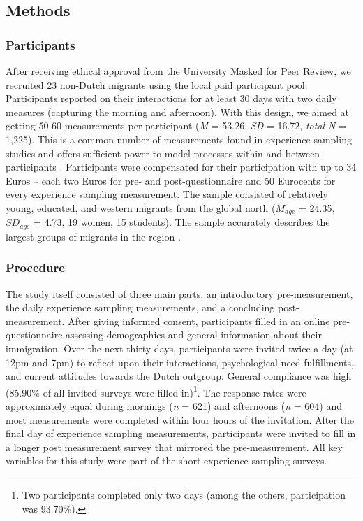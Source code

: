 \documentclass[man, 12pt, a4paper, mask]{apa7}
\theoremstyle{break}
\theoremstyle{plain}
\begin{document}
\subsection{Methods}

\subsubsection{Participants}

After receiving ethical approval from the University Masked for Peer
Review, we recruited 23 non-Dutch migrants using the local paid
participant pool. Participants reported on their interactions for at
least 30 days with two daily measures (capturing the morning and
afternoon). With this design, we aimed at getting 50-60 measurements per
participant (\textit{M} = 53.26, \textit{SD} = 16.72, \textit{total N} =
1,225). This is a common number of measurements found in experience
sampling studies and offers sufficient power to model processes within
and between participants \citep[e.g.,][]{AanhetRot2012}. Participants
were compensated for their participation with up to 34 Euros -- each two
Euros for pre- and post-questionnaire and 50 Eurocents for every
experience sampling measurement. The sample consisted of relatively
young, educated, and western migrants from the global north (\(M_{age}\)
= 24.35, \(SD_{age}\) = 4.73, 19 women, 15 students). The sample
accurately describes the largest groups of migrants in the region
\citep[][]{GemeenteGroningen2015}.

\subsubsection{Procedure}

The study itself consisted of three main parts, an introductory
pre-measurement, the daily experience sampling measurements, and a
concluding post-measurement. After giving informed consent, participants
filled in an online pre-questionnaire assessing demographics and general
information about their immigration. Over the next thirty days,
participants were invited twice a day (at 12pm and 7pm) to reflect upon
their interactions, psychological need fulfillments, and current
attitudes towards the Dutch outgroup. General compliance was high
(85.90\% of all invited surveys were filled
in)\footnote{Two participants completed only two days (among the others, participation was 93.70\%).}.
The response rates were approximately equal during mornings (\textit{n}
= 621) and afternoons (\textit{n} = 604) and most measurements were
completed within four hours of the invitation. After the final day of
experience sampling measurements, participants were invited to fill in a
longer post measurement survey that mirrored the pre-measurement. All
key variables for this study were part of the short experience sampling
surveys.
\end{document}
